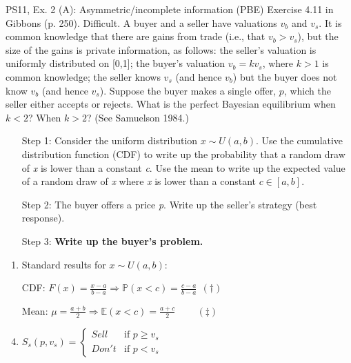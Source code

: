 \begin{frame}{PS11, Ex. 2 (A): Asymmetric/incomplete information (PBE)}
    Exercise 4.11 in Gibbons (p. 250). Difficult. A buyer and a seller have valuations $v_b$ and $v_s$. It is common knowledge that there are gains from trade (i.e., that $v_b > v_s$), but the size of the gains is private information, as follows: the seller’s valuation is uniformly distributed on [0,1]; the buyer’s valuation $v_b = kv_s$, where $k > 1$ is common knowledge; the seller knows $v_s$ (and hence $v_b$) but the buyer does not know $v_b$ (and hence $v_s$). Suppose the buyer makes a single offer, $p$, which the seller either accepts or rejects. What is the perfect Bayesian equilibrium when $k < 2$? When $k > 2$? (See Samuelson 1984.) \vspace{-8pt}
    \begin{multicols}{2}
      \begin{itemize}
        \item[Step 1:] Consider the uniform distribution $x\sim U(a, b)$. Use the cumulative distribution function (CDF) to write up the probability that a random draw of \textit{x} is lower than a constant \textit{c}. Use the mean to write up the expected value of a random draw of \textit{x} where \textit{x} is lower than a constant $c\in[a,b]$.
        \item[Step 2:] The buyer offers a price \textit{p}. Write up the seller's strategy (best response).
        \item[Step 3:] \textbf{Write up the buyer's problem.}
      \end{itemize}
      \vfill\null\columnbreak
      \begin{enumerate}
        \item Standard results for $x\sim U(a, b):$
        \item[CDF:] $F(x)=\frac{x-a}{b-a}\Rightarrow\mathbb{P}(x<c)=\frac{c-a}{b-a}\ \ (\dagger)$
        \item[Mean:] $\mu=\frac{a+b}{2}\Rightarrow\mathbb{E}(x<c)=\frac{a+c}{2}\quad\quad\ (\ddagger)$
        \item $S_s(p,v_s)=\left\{\begin{array}{ll}
          Sell  & \text{if }p\geq v_s \\
          Don't & \text{if }p < v_s
        \end{array}\right.$
      \end{enumerate}
      \vfill\null
    \end{multicols}
\end{frame}
